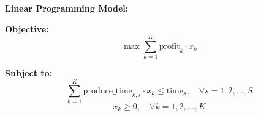 \documentclass{article}
\begin{document}
\textbf{Linear Programming Model:}

\textbf{Objective:}
\[
\max \sum_{k=1}^{K} \text{profit}_k \cdot x_k
\]

\textbf{Subject to:}
\[
\sum_{k=1}^{K} \text{produce\_time}_{k, s} \cdot x_k \leq \text{time}_s, \quad \forall s = 1, 2, \ldots, S
\]
\[
x_k \geq 0, \quad \forall k = 1, 2, \ldots, K
\]
\end{document}

